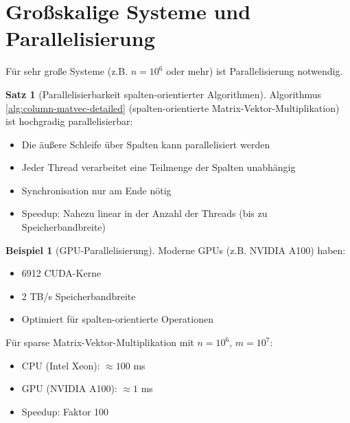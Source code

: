 \documentclass[a4paper,12pt]{report}
\theoremstyle{definition}
\newtheorem{beispiel}{Beispiel}
\newtheorem{satz}{Satz}
\begin{document}
	\section{Großskalige Systeme und Parallelisierung}
	
	Für sehr große Systeme (z.B. $n = 10^6$ oder mehr) ist Parallelisierung notwendig.
	
	\begin{satz}[Parallelisierbarkeit spalten-orientierter Algorithmen]
		Algorithmus \ref{alg:column-matvec-detailed} (spalten-orientierte Matrix-Vektor-Multiplikation) ist hochgradig parallelisierbar:
		
		\begin{itemize}
			\item Die äußere Schleife über Spalten kann parallelisiert werden
			\item Jeder Thread verarbeitet eine Teilmenge der Spalten unabhängig
			\item Synchronisation nur am Ende nötig
			\item Speedup: Nahezu linear in der Anzahl der Threads (bis zu Speicherbandbreite)
		\end{itemize}
	\end{satz}
	
	\begin{beispiel}[GPU-Parallelisierung]
		Moderne GPUs (z.B. NVIDIA A100) haben:
		\begin{itemize}
			\item 6912 CUDA-Kerne
			\item 2 TB/s Speicherbandbreite
			\item Optimiert für spalten-orientierte Operationen
		\end{itemize}
		
		Für sparse Matrix-Vektor-Multiplikation mit $n = 10^6$, $m = 10^7$:
		\begin{itemize}
			\item CPU (Intel Xeon): $\approx 100$ ms
			\item GPU (NVIDIA A100): $\approx 1$ ms
			\item Speedup: Faktor 100
		\end{itemize}
	\end{beispiel}
	
\end{document}
